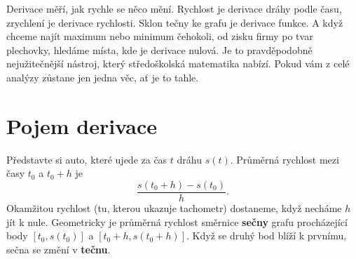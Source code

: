 \label{kap:derivace}

Derivace měří, jak rychle se něco mění. Rychlost je derivace dráhy podle času, zrychlení je derivace rychlosti. Sklon tečny ke grafu je derivace funkce. A když chceme najít maximum nebo minimum čehokoli, od zisku firmy po tvar plechovky, hledáme místa, kde je derivace nulová. Je to pravděpodobně nejužitečnější nástroj, který středoškolská matematika nabízí. Pokud vám z celé analýzy zůstane jen jedna věc, ať je to tahle.

\section{Pojem derivace}\label{sec:pojem-derivace}

Představte si auto, které ujede za čas $t$ dráhu $s(t)$. Průměrná rychlost mezi časy $t_0$ a $t_0 + h$ je
\begin{equation*}
  \frac{s(t_0 + h) - s(t_0)}{h}.
\end{equation*}
Okamžitou rychlost (tu, kterou ukazuje tachometr) dostaneme, když necháme $h$ jít k nule. Geometricky je průměrná rychlost směrnice \textbf{sečny} grafu procházející body $[t_0, s(t_0)]$ a $[t_0 + h, s(t_0 + h)]$. Když se druhý bod blíží k prvnímu, sečna se změní v \textbf{tečnu}.

\begin{center}
\end{center}

